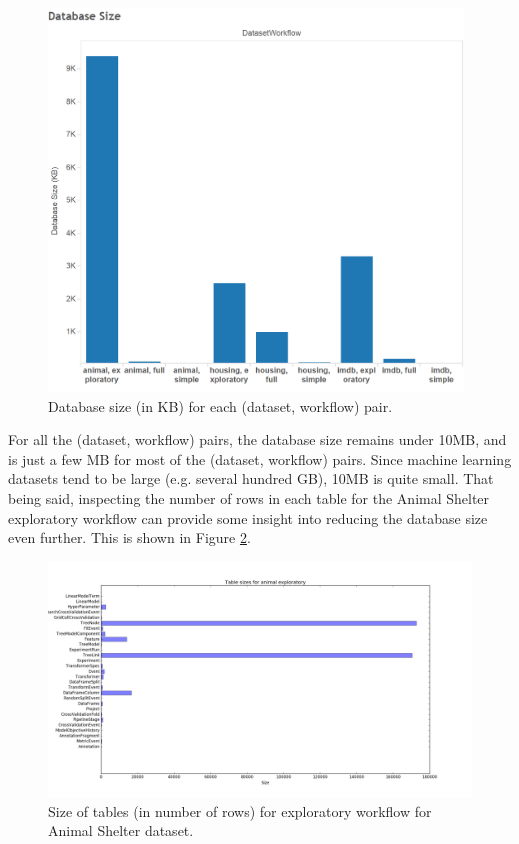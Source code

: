 \begin{figure}
  \centering
  \includegraphics[height=4.0in]{dbsize}
  \caption{
    Database size (in KB) for each (dataset, workflow) pair.
  }
  \label{fig:dbsize}
\end{figure}

For all the (dataset, workflow) pairs, the database size remains under 10MB, and is
just a few MB for most of the (dataset, workflow) pairs. Since machine learning datasets
tend to be large (e.g. several hundred GB), 10MB is quite small. That being said, inspecting
the number of rows in each table for the Animal Shelter exploratory workflow 
can provide some insight into reducing the database size even further. This is shown in Figure
\ref{fig:animal_exploratory_table_sizes}.

\begin{figure}
  \centering
  \includegraphics[width=6.0in]{animal_exploratory_table_sizes}
  \caption{
    Size of tables (in number of rows) for exploratory workflow for Animal
    Shelter dataset.
  }
  \label{fig:animal_exploratory_table_sizes}
\end{figure}

